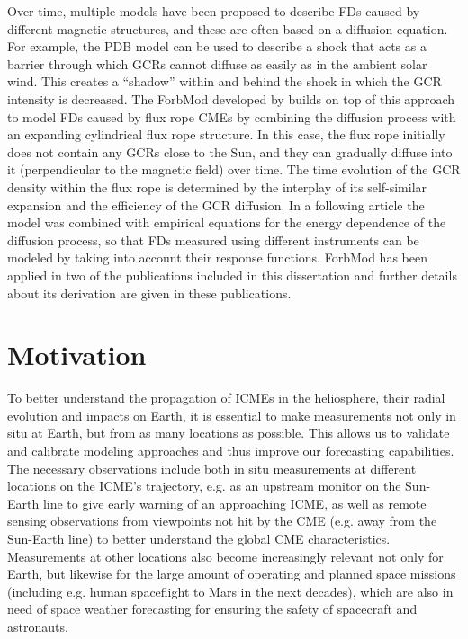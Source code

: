 Over time, multiple models have been proposed to describe \acp{FD} caused by different magnetic structures, and these are often based on a diffusion equation. For example, the \acl{PDB} model \citep[\acs{PDB},][]{Wibberenz-1998} can be used to describe a shock that acts as a barrier through which \acp{GCR} cannot diffuse as easily as in the ambient solar wind. This creates a ``shadow'' within and behind the shock in which the \ac{GCR} intensity is decreased.
The \ac{ForbMod} developed by \citet{Dumbovic2018-ForbMod} builds on top of this approach to model \acp{FD} caused by flux rope \acp{CME} by combining the diffusion process with an expanding cylindrical flux rope structure. In this case, the flux rope initially does not contain any \acp{GCR} close to the Sun, and they can gradually diffuse into it (perpendicular to the magnetic field) over time. The time evolution of the \ac{GCR} density within the flux rope is determined by the interplay of its self-similar expansion and the efficiency of the \ac{GCR} diffusion. In a following article \citep{Dumbovic-2020-ForbMod} the model was combined with empirical equations for the energy dependence of the diffusion process, so that \acp{FD} measured using different instruments can be modeled by taking into account their response functions. \ac{ForbMod} has been applied in two of the publications included in this dissertation \citep{Forstner-2020,Forstner-2021-SolO} and further details about its derivation are given in these publications.

\section{Motivation}
\label{sec:motivation}

To better understand the propagation of \acp{ICME} in the heliosphere, their radial evolution and impacts on Earth, it is essential to make measurements not only in situ at Earth, but from as many locations as possible. This allows us to validate and calibrate modeling approaches and thus improve our forecasting capabilities. The necessary observations include both in situ measurements at different locations on the \ac{ICME}'s trajectory, e.g. as an upstream monitor on the Sun-Earth line to give early warning of an approaching \ac{ICME}, as well as remote sensing observations from viewpoints not hit by the \ac{CME} (e.g. away from the Sun-Earth line) to better understand the global \ac{CME} characteristics. Measurements at other locations also become increasingly relevant not only for Earth, but likewise for the large amount of operating and planned space missions (including e.g. human spaceflight to Mars in the next decades), which are also in need of space weather forecasting for ensuring the safety of spacecraft and astronauts.

